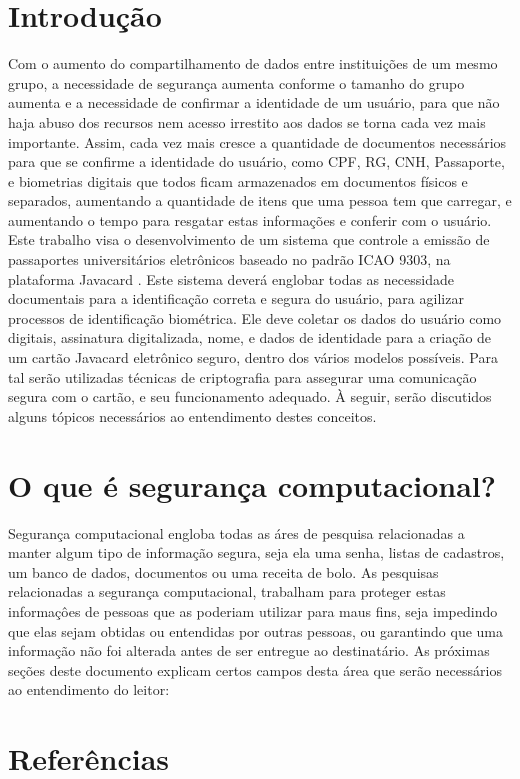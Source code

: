 \documentclass[12pt]{article}
\begin{document}
	\newpage

	\tableofcontents
	\newpage
	
	\section{Introdução}
		\begin{flushleft}

			\hspace{2cm}Com o aumento do compartilhamento de dados entre instituições de um mesmo grupo, a necessidade de segurança aumenta conforme o tamanho do grupo aumenta e a necessidade de confirmar a identidade de um usuário, para que não haja abuso dos recursos nem acesso irrestito aos dados se torna cada vez mais importante. Assim, cada vez mais cresce a quantidade de documentos necessários para que se confirme a identidade do usuário, como CPF, RG, CNH, Passaporte, e biometrias digitais que todos ficam armazenados em documentos físicos e separados, aumentando a quantidade de itens que uma pessoa tem que carregar, e aumentando o tempo para resgatar estas informações e conferir com o usuário. \\
Este trabalho visa o desenvolvimento de um sistema que controle a emissão de passaportes universitários eletrônicos baseado no padrão ICAO 9303, na plataforma Javacard \cite{JAVACHEN}. Este sistema deverá englobar todas as necessidade documentais para a identificação correta e segura do usuário, para agilizar processos de identificação biométrica. Ele deve coletar os dados do usuário como digitais, assinatura digitalizada, nome, e dados de identidade para a criação de um cartão Javacard eletrônico seguro, dentro dos vários modelos possíveis. Para tal serão utilizadas técnicas de criptografia para assegurar uma comunicação segura com o cartão, e seu funcionamento adequado. À seguir, serão discutidos alguns tópicos necessários ao entendimento destes conceitos.


		\end{flushleft}

	\section{O que é segurança computacional?}
		\begin{flushleft}

		\hspace{2cm} Segurança computacional engloba todas as áres de pesquisa relacionadas a manter algum tipo de informação segura, seja ela uma senha, listas de cadastros, um banco de dados, documentos ou uma receita de bolo. As pesquisas relacionadas a segurança computacional, trabalham para proteger estas informaçôes de pessoas que as poderiam utilizar para maus fins, seja impedindo que elas sejam obtidas ou entendidas por outras pessoas, ou garantindo que uma informação não foi alterada antes de ser entregue ao destinatário. As próximas seções deste documento explicam certos campos desta área que serão necessários ao entendimento do leitor:

		\end{flushleft}

	\section{Referências}
		
		
\end{document}
